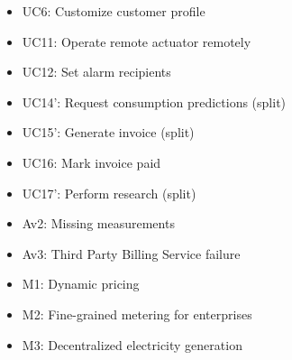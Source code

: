 \begin{itemize}
\begin{itemize}
	  	\item UC6: Customize customer profile
	  	\item UC11: Operate remote actuator remotely
	  	\item UC12: Set alarm recipients
	  	\item UC14': Request consumption predictions (split)
	  	\item UC15': Generate invoice (split)
	  	\item UC16: Mark invoice paid
	  	\item UC17': Perform research (split)
	  	\item Av2: Missing measurements
	  	\item Av3: Third Party Billing Service failure
	  	\item M1: Dynamic pricing
	  	\item M2: Fine-grained metering for enterprises
	  	\item M3: Decentralized electricity generation
	\end{itemize}
\end{itemize}
